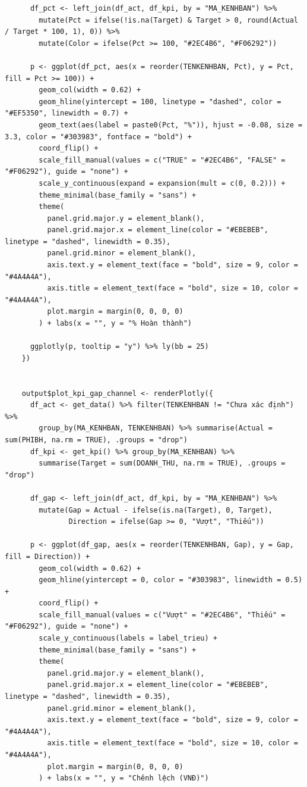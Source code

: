 \documentclass[12pt, a4paper]{article}
\begin{document}
\begin{lstlisting}
      df_pct <- left_join(df_act, df_kpi, by = "MA_KENHBAN") %>%
        mutate(Pct = ifelse(!is.na(Target) & Target > 0, round(Actual / Target * 100, 1), 0)) %>%
        mutate(Color = ifelse(Pct >= 100, "#2EC4B6", "#F06292"))

      p <- ggplot(df_pct, aes(x = reorder(TENKENHBAN, Pct), y = Pct, fill = Pct >= 100)) +
        geom_col(width = 0.62) +
        geom_hline(yintercept = 100, linetype = "dashed", color = "#EF5350", linewidth = 0.7) +
        geom_text(aes(label = paste0(Pct, "%")), hjust = -0.08, size = 3.3, color = "#303983", fontface = "bold") +
        coord_flip() +
        scale_fill_manual(values = c("TRUE" = "#2EC4B6", "FALSE" = "#F06292"), guide = "none") +
        scale_y_continuous(expand = expansion(mult = c(0, 0.2))) +
        theme_minimal(base_family = "sans") +
        theme(
          panel.grid.major.y = element_blank(),
          panel.grid.major.x = element_line(color = "#EBEBEB", linetype = "dashed", linewidth = 0.35),
          panel.grid.minor = element_blank(),
          axis.text.y = element_text(face = "bold", size = 9, color = "#4A4A4A"),
          axis.title = element_text(face = "bold", size = 10, color = "#4A4A4A"),
          plot.margin = margin(0, 0, 0, 0)
        ) + labs(x = "", y = "% Hoàn thành")

      ggplotly(p, tooltip = "y") %>% ly(bb = 25)
    })


    output$plot_kpi_gap_channel <- renderPlotly({
      df_act <- get_data() %>% filter(TENKENHBAN != "Chưa xác định") %>%
        group_by(MA_KENHBAN, TENKENHBAN) %>% summarise(Actual = sum(PHIBH, na.rm = TRUE), .groups = "drop")
      df_kpi <- get_kpi() %>% group_by(MA_KENHBAN) %>%
        summarise(Target = sum(DOANH_THU, na.rm = TRUE), .groups = "drop")

      df_gap <- left_join(df_act, df_kpi, by = "MA_KENHBAN") %>%
        mutate(Gap = Actual - ifelse(is.na(Target), 0, Target),
               Direction = ifelse(Gap >= 0, "Vượt", "Thiếu"))

      p <- ggplot(df_gap, aes(x = reorder(TENKENHBAN, Gap), y = Gap, fill = Direction)) +
        geom_col(width = 0.62) +
        geom_hline(yintercept = 0, color = "#303983", linewidth = 0.5) +
        coord_flip() +
        scale_fill_manual(values = c("Vượt" = "#2EC4B6", "Thiếu" = "#F06292"), guide = "none") +
        scale_y_continuous(labels = label_trieu) +
        theme_minimal(base_family = "sans") +
        theme(
          panel.grid.major.y = element_blank(),
          panel.grid.major.x = element_line(color = "#EBEBEB", linetype = "dashed", linewidth = 0.35),
          panel.grid.minor = element_blank(),
          axis.text.y = element_text(face = "bold", size = 9, color = "#4A4A4A"),
          axis.title = element_text(face = "bold", size = 10, color = "#4A4A4A"),
          plot.margin = margin(0, 0, 0, 0)
        ) + labs(x = "", y = "Chênh lệch (VNĐ)")


\end{lstlisting}
\end{document}
